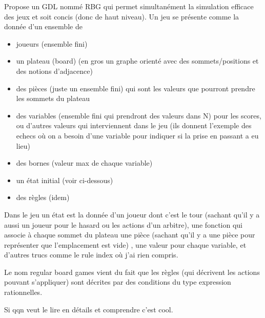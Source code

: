 \documentclass[a4paper,11pt]{article}
\begin{document}
Propose un GDL nommé RBG qui permet simultanément la simulation efficace des
jeux et soit concis (donc de haut niveau). Un jeu se présente comme la donnée
d'un ensemble de
\begin{itemize}
  \item joueurs (ensemble fini)
  \item un plateau (board) (en gros un graphe orienté avec des
sommets/positions et des notions d'adjacence)
  \item des pièces (juste un ensemble fini) qui sont les valeurs que pourront
    prendre les sommets du plateau 
  \item des variables (ensemble fini qui prendront des valeurs dans N) pour
    les scores, ou d'autres valeurs qui interviennent dans le jeu (ils donnent
    l'exemple des echecs où on a besoin d'une variable pour indiquer si la prise
    en passant a eu lieu)
  \item des bornes (valeur max de chaque variable)
  \item un état initial (voir ci-dessous)
  \item des règles (idem)
\end{itemize} 

Dans le jeu un état est la donnée d'un joueur dont c'est le tour (sachant qu'il
y a aussi un joueur pour le hasard ou les actions d'un arbitre), une fonction
qui associe à chaque sommet du plateau une pièce (sachant qu'il y a une pièce
pour représenter que l'emplacement est vide) , une valeur pour chaque variable, 
et d'autres trucs comme le rule index où j'ai rien compris.

Le nom regular board games vient du fait que les règles (qui décrivent les
actions pouvant s'appliquer) sont décrites par des conditions du type expression
rationnelles.

Si qqn veut le lire en détails et comprendre c'est cool.

\end{document}
